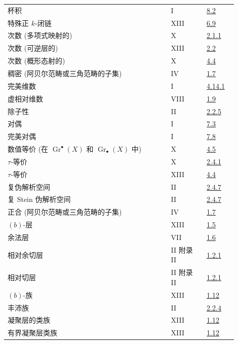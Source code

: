 \begin{longtable}{@{}>{\raggedright\arraybackslash}p{0.64\linewidth}>{\raggedright\arraybackslash}p{0.14\linewidth}>{\raggedright\arraybackslash}p{0.12\linewidth}@{}}
杯积 & I & \hyperlink{sga6.e01.para.8-2}{8.2}\\
特殊正 \(k\)-闭链 & XIII & \hyperlink{sga6.e13.def.6-9}{6.9}\\
次数 (多项式映射的) & X & \hyperlink{sga6.e10.def.2-1-1}{2.1.1}\\
次数 (可逆层的) & XIII & \hyperlink{sga6.e13.para.2-2}{2.2}\\
次数 (概形态射的) & X & \hyperlink{sga6.e10.sec.4.4}{4.4}\\
稠密 (阿贝尔范畴或三角范畴的子集) & IV & \hyperlink{sga6.e04.def.1-7}{1.7}\\
完美维数 & I & \hyperlink{sga6.e01.def.4-14-1}{4.14.1}\\
虚相对维数 & VIII & \hyperlink{sga6.e08.def.1-9}{1.9}\\
除子性 & II & \hyperlink{sga6.e02.def.2-2-5}{2.2.5}\\
对偶 & I & \hyperlink{sga6.e01.def.7-3}{7.3}\\
完美对偶 & I & \hyperlink{sga6.e01.cor.7-8}{7.8}\\
数值等价 (在 \(\operatorname{Gr}^\bullet(X)\) 和 \(\operatorname{Gr}_\bullet(X)\) 中) & X & \hyperlink{sga6.e10.sec.4.5}{4.5}\\
\(\tau\)-等价 & X & \hyperlink{sga6.e10.def.2-4-1}{2.4.1}\\
\(\tau\)-等价 & XIII & \hyperlink{sga6.e13.para.4-4}{4.4}\\
复伪解析空间 & II & \hyperlink{sga6.e02.def.2-4-7}{2.4.7}\\
复 Stein 伪解析空间 & II & \hyperlink{sga6.e02.def.2-4-7}{2.4.7}\\
正合 (阿贝尔范畴或三角范畴的子集) & IV & \hyperlink{sga6.e04.def.1-7}{1.7}\\
\((b)\)-层 & XIII & \hyperlink{sga6.e13.def.1-5}{1.5}\\
余法层 & VII & \hyperlink{sga6.e07.def.1-6}{1.6}\\
相对余切层 & II 附录 II & \hyperlink{sga6.e02.para.1-2-1}{1.2.1}\\
相对切层 & II 附录 II & \hyperlink{sga6.e02.para.1-2-1}{1.2.1}\\
\((b)\)-族 & XIII & \hyperlink{sga6.e13.para.1-12}{1.12}\\
丰沛族 & II & \hyperlink{sga6.e02.def.2-2-4}{2.2.4}\\
凝聚层的类族 & XIII & \hyperlink{sga6.e13.para.1-12}{1.12}\\
有界凝聚层类族 & XIII & \hyperlink{sga6.e13.para.1-12}{1.12}\\

\end{longtable}
